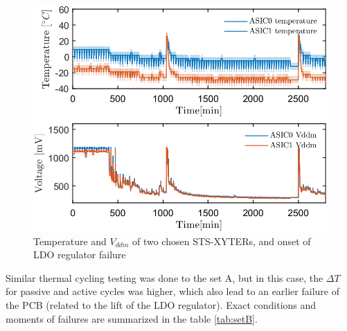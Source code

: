 \begin{figure}[!h]
\centering
\includegraphics[width=0.6\columnwidth]{Chapter3/Cycling/Images/temps_vddm.png}
\caption{Temperature and $V_{ddm}$ of two chosen \gls{STS}-XYTERs, and onset of \gls{LDO} regulator failure}
\label{fig_cold_startup_vddm}
\end{figure}

Similar thermal cycling testing was done to the set A, but in this case, the $\Delta T$ for passive and active cycles was higher, which also lead to an earlier failure of the \gls{PCB} (related to the lift of the \gls{LDO} regulator). Exact conditions and moments of failures are summarized in the table \ref{tab:setB}.


